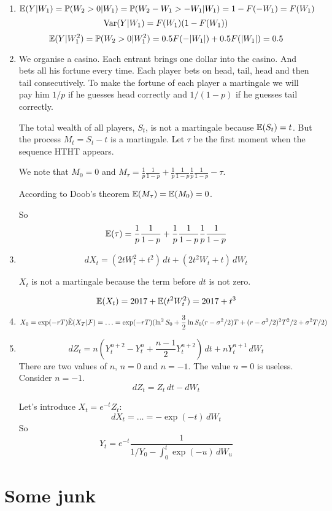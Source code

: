 \documentclass[12pt, a4paper]{article}
\newcommand{\cF}{\mathcal{F}}
\begin{document}
\begin{enumerate}
  \item
    \[
      \mathbb{E}(Y|W_1) = \mathbb{P}(W_2 > 0 |W_1)=\mathbb{P}(W_2 - W_1 > -W_1 | W_1)= 1 - F(-W_1)=F(W_1)
    \]
    \[
      \operatorname{Var}(Y|W_1) = F(W_1)(1-F(W_1))
    \]
    \[
      \mathbb{E}(Y|W_1^2)=\mathbb{P}(W_2 > 0|W_1^2)=0.5F(-|W_1|)+0.5F(|W_1|)=0.5
    \]
  \item We organise a casino.
    Each entrant brings one dollar into the casino.
    And bets all his fortune every time.
    Each player bets on head, tail, head and then tail consecutively.
    To make the fortune of each player a martingale we will pay him
    $1/p$ if he guesses head correctly and $1/(1-p)$ if he guesses tail correctly.

    The total wealth of all players, $S_t$,
    is not a martingale because $\mathbb{E}(S_t)=t$.
    But the process $M_t = S_t - t$ is a martingale.
    Let $\tau$ be the first moment when the sequence HTHT appears.

    We note that $M_0 = 0$ and $M_{\tau}=\frac{1}{p}\frac{1}{1-p} + \frac{1}{p}\frac{1}{1-p}\frac{1}{p}\frac{1}{1-p}-\tau$.

    According to Doob's theorem $\mathbb{E}(M_{\tau})=\mathbb{E}(M_0)=0$.

    So
    \[
      \mathbb{E}(\tau) = \frac{1}{p}\frac{1}{1-p} + \frac{1}{p}\frac{1}{1-p}\frac{1}{p}\frac{1}{1-p}
    \]
  \item
    \[
      dX_t = (2tW_t^2 + t^2) \, dt + (2t^2 W_t + t) \, dW_t
    \]

    $X_t$ is not a martingale because the term before $dt$ is not zero.

    \[
      \mathbb{E}(X_t) = 2017 + \mathbb{E}(t^2 W_t^2) = 2017 + t^3
    \]
  \item
    \[
 X_0 = \exp(-rT) \tilde{\E}(X_T | \cF) = \ldots =
 \exp(-rT)(\ln^2 S_0 + \frac{3}{2}\ln S_0 (r-\sigma^2/2)T  + (r-\sigma^2/2)^2T^2/2 + \sigma^2 T/2 )
    \]
  \item
    \[
dZ_t = n(Y_t^{n+2} - Y_t^n + \frac{n-1}{2}Y_t^{n+2}) \, dt + n Y_t^{n+1} \, dW_t
\]
There are two values of $n$, $n=0$ and $n=-1$.
The value $n=0$ is useless.
Consider $n=-1$.
\[
  dZ_t = Z_t \, dt - dW_t
\]

Let's introduce $X_t = e^{-t} Z_t$:
\[
  dX_t = \ldots = -\exp(-t) \, dW_t
\]
So
\[
  Y_t = e^{-t}\frac{1}{1/Y_0 - \int_0^t\exp(-u) \, dW_u}
\]

\end{enumerate}


\section{Some junk}
\end{document}
